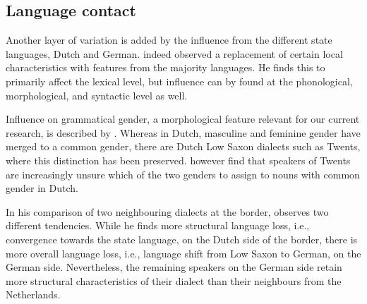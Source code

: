 \documentclass[output=paper,colorlinks,citecolor=brown]{langscibook}
\begin{document}



\subsection{Language contact}\label{language-contact}
Another layer of variation is added by the influence from the different state languages, Dutch and German. \citet{Goossens2019} indeed observed a replacement of certain local characteristics with features from the majority languages. He finds this to primarily affect the lexical level, but influence can by found at the phonological, morphological, and syntactic level as well. 

Influence on grammatical gender, a morphological feature relevant for our current research, is described by \citet[107--109]{BloemhoffEtAl2019}. Whereas in Dutch, masculine and feminine gender have merged to a common gender, there are Dutch Low Saxon dialects such as Twents, where this distinction has been preserved. \citet{BloemhoffEtAl2019} however find that speakers of Twents are increasingly unsure which of the two genders to assign to nouns with common gender in Dutch. 

In his comparison of two neighbouring dialects at the border, \citet{Smits2011} observes two different tendencies. While he finds more structural language loss, i.e., convergence towards the state language, on the Dutch side of the border, there is more overall language loss, i.e., language shift from Low Saxon to German, on the German side. Nevertheless, the remaining speakers on the German side retain more structural characteristics of their dialect than their neighbours from the Netherlands.

\end{document}
